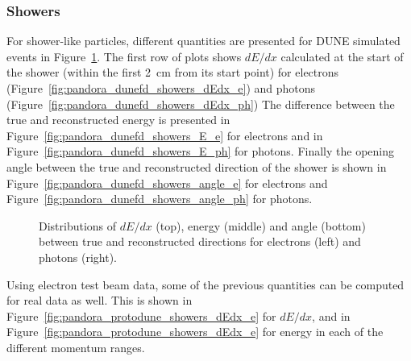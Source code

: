 \subsubsection{Showers}
\label{sec:Pandora:High:Showers}

For shower-like particles, different quantities are presented for DUNE  simulated events in Figure~\ref{fig:pandora_dunefd_showers}. The first row of plots shows $dE/dx$ calculated at the start of the shower (within the first \SI{2}{cm} from its start point) for electrons (Figure~\ref{fig:pandora_dunefd_showers_dEdx_e}) and photons (Figure~\ref{fig:pandora_dunefd_showers_dEdx_ph}) %
The difference between the true and reconstructed energy is presented in Figure~\ref{fig:pandora_dunefd_showers_E_e} for electrons and in Figure~\ref{fig:pandora_dunefd_showers_E_ph} for photons. Finally the opening angle between the true and reconstructed direction of the shower is shown in Figure~\ref{fig:pandora_dunefd_showers_angle_e} for electrons and Figure~\ref{fig:pandora_dunefd_showers_angle_ph}  for photons. 

\begin{figure}[!ht]
\centering
\subfloat[]{\label{fig:pandora_dunefd_showers_dEdx_e}
}
\subfloat[]{\label{fig:pandora_dunefd_showers_dEdx_ph}
}

\subfloat[]{\label{fig:pandora_dunefd_showers_E_e}
}
\subfloat[]{\label{fig:pandora_dunefd_showers_E_ph}
}

\subfloat[]{\label{fig:pandora_dunefd_showers_angle_e}
}
\subfloat[]{\label{fig:pandora_dunefd_showers_angle_ph}
}
\caption[Distributions of $dE/dx$, energy and angle between true and reconstructed directions for $e^-$s and $\gamma$s]{Distributions of $dE/dx$ (top), energy (middle) and angle (bottom) between true and reconstructed directions for electrons (left) and photons (right).}
\label{fig:pandora_dunefd_showers}
\end{figure}


Using  electron test beam data, some of the previous quantities can be computed for real data as well. This is shown in Figure~\ref{fig:pandora_protodune_showers_dEdx_e} for $dE/dx$, and in Figure~\ref{fig:pandora_protodune_showers_dEdx_e} for energy in each of the different momentum ranges.   

